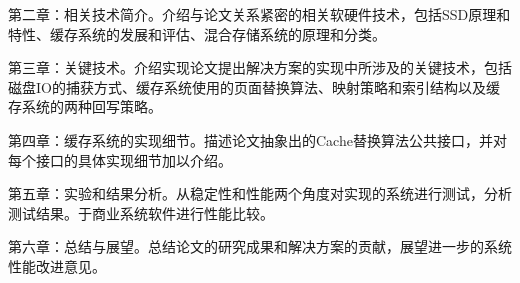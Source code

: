 第二章：相关技术简介。介绍与论文关系紧密的相关软硬件技术，包括SSD原理和特性、缓存系统的发展和评估、混合存储系统的原理和分类。

第三章：关键技术。介绍实现论文提出解决方案的实现中所涉及的关键技术，包括磁盘IO的捕获方式、缓存系统使用的页面替换算法、映射策略和索引结构以及缓存系统的两种回写策略。

第四章：缓存系统的实现细节。描述论文抽象出的Cache替换算法公共接口，并对每个接口的具体实现细节加以介绍。

第五章：实验和结果分析。从稳定性和性能两个角度对实现的系统进行测试，分析测试结果。于商业系统软件进行性能比较。

第六章：总结与展望。总结论文的研究成果和解决方案的贡献，展望进一步的系统性能改进意见。


